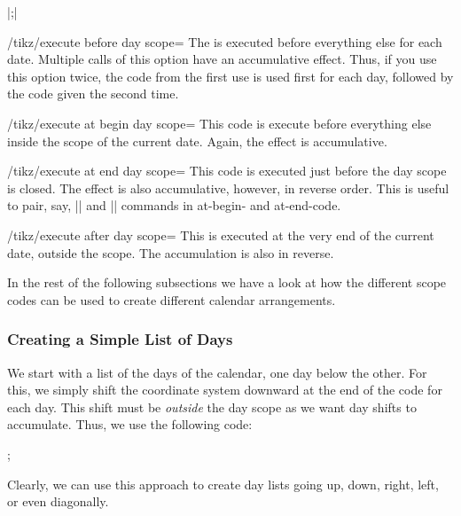 \begin{command}{\calendar {}|;|}
    \begin{key}{/tikz/execute before day scope=}
        The  is executed before everything else for each date.
        Multiple calls of this option have an accumulative effect. Thus, if you
        use this option twice, the code from the first use is used first for
        each day, followed by the code given the second time.
    \end{key}
    \begin{key}{/tikz/execute at begin day scope=}
        This code is execute before everything else inside the scope of the
        current date. Again, the effect is accumulative.
    \end{key}
    \begin{key}{/tikz/execute at end day scope=}
        This code is executed just before the day scope is closed. The effect
        is also accumulative, however, in reverse order. This is useful to
        pair, say, |\scope| and |\endscope| commands in at-begin- and
        at-end-code.
    \end{key}
    \begin{key}{/tikz/execute after day scope=}
        This is executed at the very end of the current date, outside the
        scope. The accumulation is also in reverse.
    \end{key}
\end{command}

In the rest of the following subsections we have a look at how the different
scope codes can be used to create different calendar arrangements.


\subsubsection{Creating a Simple List of Days}

We start with a list of the days of the calendar, one day below the other. For
this, we simply shift the coordinate system downward at the end of the code for
each day. This shift must be \emph{outside} the day scope as we want day shifts
to accumulate. Thus, we use the following code:
%
\begin{codeexample}[]
\tikz
  \calendar [dates=2000-01-01 to 2000-01-08,
             execute after day scope=
               {\pgftransformyshift{-1em}}];
\end{codeexample}
%
Clearly, we can use this approach to create day lists going up, down, right,
left, or even diagonally.


